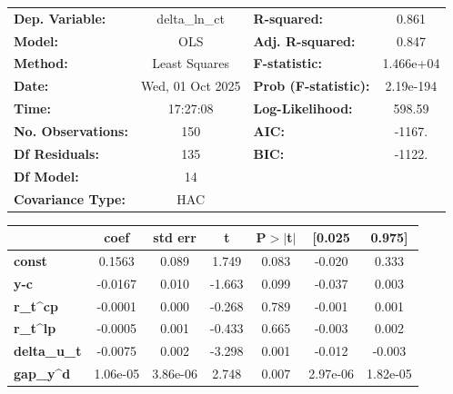 \begin{center}
\begin{tabular}{lclc}
\toprule
\textbf{Dep. Variable:}    &  delta\_ln\_ct   & \textbf{  R-squared:         } &     0.861   \\
\textbf{Model:}            &       OLS        & \textbf{  Adj. R-squared:    } &     0.847   \\
\textbf{Method:}           &  Least Squares   & \textbf{  F-statistic:       } & 1.466e+04   \\
\textbf{Date:}             & Wed, 01 Oct 2025 & \textbf{  Prob (F-statistic):} & 2.19e-194   \\
\textbf{Time:}             &     17:27:08     & \textbf{  Log-Likelihood:    } &    598.59   \\
\textbf{No. Observations:} &         150      & \textbf{  AIC:               } &    -1167.   \\
\textbf{Df Residuals:}     &         135      & \textbf{  BIC:               } &    -1122.   \\
\textbf{Df Model:}         &          14      & \textbf{                     } &             \\
\textbf{Covariance Type:}  &       HAC        & \textbf{                     } &             \\
\bottomrule
\end{tabular}
\begin{tabular}{lcccccc}
                     & \textbf{coef} & \textbf{std err} & \textbf{t} & \textbf{P$> |$t$|$} & \textbf{[0.025} & \textbf{0.975]}  \\
\midrule
\textbf{const}       &       0.1563  &        0.089     &     1.749  &         0.083        &       -0.020    &        0.333     \\
\textbf{y-c}         &      -0.0167  &        0.010     &    -1.663  &         0.099        &       -0.037    &        0.003     \\
\textbf{r\_t^cp}     &      -0.0001  &        0.000     &    -0.268  &         0.789        &       -0.001    &        0.001     \\
\textbf{r\_t^lp}     &      -0.0005  &        0.001     &    -0.433  &         0.665        &       -0.003    &        0.002     \\
\textbf{delta\_u\_t} &      -0.0075  &        0.002     &    -3.298  &         0.001        &       -0.012    &       -0.003     \\
\textbf{gap\_y^d}    &     1.06e-05  &     3.86e-06     &     2.748  &         0.007        &     2.97e-06    &     1.82e-05     \\

\end{tabular}
\end{center}
